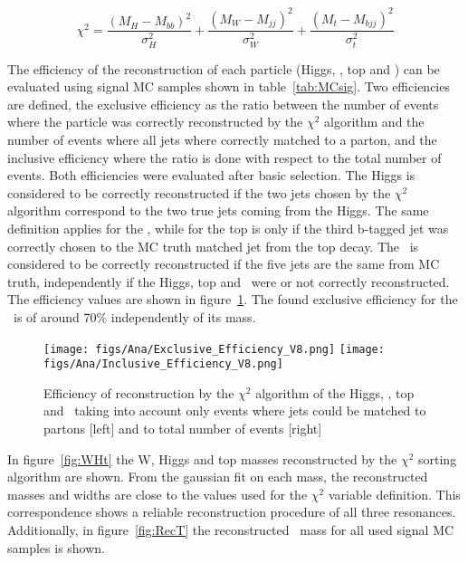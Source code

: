\begin{equation}
\chi^{2}=\frac{(M_{H}-M_{bb})^{2}}{\sigma_{H}^{2}}+\frac{(M_{W}-M_{jj})^{2}}{\sigma_{W}^{2}}+\frac{(M_{t}-M_{bjj})^{2}}{\sigma_{t}^{2}}
\label{eq:chi2def}
\end{equation}

The efficiency of the reconstruction of each particle (Higgs, \W, top and \Tp) can be evaluated using signal MC samples shown in table~\ref{tab:MCsig}. Two efficiencies are defined, the exclusive efficiency as the ratio between the number of events where the particle was correctly reconstructed by the $\chi^{2}$ algorithm and the number of events where all jets where correctly matched to a parton, and the inclusive efficiency where the ratio is done with respect to the total number of events. Both efficiencies were evaluated after basic selection. The Higgs is considered to be correctly reconstructed if the two jets chosen by the $\chi^{2}$ algorithm correspond to the two true jets coming from the Higgs. The same definition applies for the \W, while for the top is only if the third b-tagged jet was correctly chosen to the MC truth matched jet from the top decay. The \Tp~is considered to be correctly reconstructed if the five jets are the same from MC truth, independently if the Higgs, top and \W~were or not correctly reconstructed. The efficiency values are shown in figure~\ref{fig:RecEff}. The found exclusive efficiency for the \Tp~is of around 70\% independently of its mass.

\begin{figure}[!Hhtbp]
  \begin{center}
    \texttt{[image: figs/Ana/Exclusive\_Efficiency\_V8.png]}
    \texttt{[image: figs/Ana/Inclusive\_Efficiency\_V8.png]}
    \caption{Efficiency of reconstruction by the $\chi^{2}$ algorithm of the Higgs, \W, top and \Tp~taking into account only events where jets could be matched to partons [left] and to total number of events [right]}
    \label{fig:RecEff}
  \end{center}
\end{figure}

In figure~\ref{fig:WHt} the W, Higgs and top masses reconstructed by the $\chi^{2}$ sorting algorithm are shown. From the gaussian fit on each mass, the reconstructed masses and widths are close to the values used for the $\chi^{2}$ variable definition. This correspondence shows a reliable reconstruction procedure of all three resonances. Additionally, in figure~\ref{fig:RecT} the reconstructed \Tp~mass for all used signal MC samples is shown.

